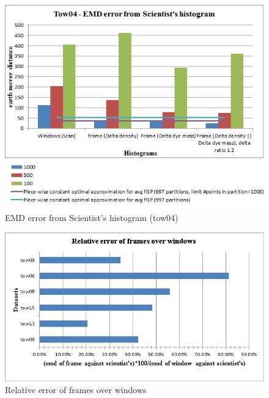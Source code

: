 \documentclass{vldb}
\begin{document}
\begin{figure}[htb]
   \centering
   \includegraphics[width=.99\columnwidth]{figures/tow04_results}
   \caption{EMD error from Scientist's histogram (tow04)}
   \label{fig:eval-emd-error-tow04}
\end{figure}

\begin{figure}[htb]
   \centering
   \includegraphics[width=.99\columnwidth]{figures/relativeErrorFramesOverWindows_6datasets}
   \caption{Relative error of frames over windows}
   \label{fig:eval-relative-error}
\end{figure}
\end{document}
